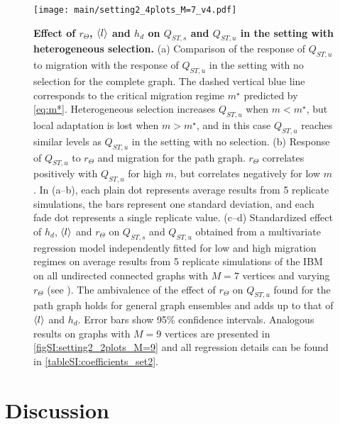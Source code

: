\begin{figure}[ht] 
    \centering
      \texttt{[image: main/setting2\_4plots\_M=7\_v4.pdf]}
    \caption{\textbf{Effect of $r_\Theta$, $\langle l \rangle$ and $h_d$ on $Q_{ST,s}$ and $Q_{ST,u}$ in the setting with heterogeneous selection.}
    (a) Comparison of the response of $Q_{ST,u}$ to migration with the response of $Q_{ST,u}$ in the setting with no selection for the complete graph. The dashed vertical blue line corresponds to the critical migration regime $m^\star$ predicted by \cref{eq:m*}. Heterogeneous selection increases $Q_{ST,u}$ when $m < m^\star$, but local adaptation is lost when $m > m^\star$, and in this case $Q_{ST,u}$ reaches similar levels as $Q_{ST,u}$ in the setting with no selection. 
    (b) Response of $Q_{ST,u}$ to $r_\Theta$ and migration for the path graph. $r_\Theta$ correlates positively with $Q_{ST,u}$ for high $m$, but correlates negatively for low $m$.
    In (a--b), each plain dot represents average results from 5 replicate simulations, the bars represent one standard deviation, and each fade dot represents a single replicate value.
    (c--d) Standardized effect of $h_d$, $\langle l \rangle$ and $r_\Theta$ on $Q_{ST,s}$ and $Q_{ST,u}$ obtained from a multivariate regression model independently fitted for low and high migration regimes on average results from 5 replicate simulations of the IBM on all undirected connected graphs with $M=7$ vertices and varying $r_\Theta$ (see ).
    The ambivalence of the effect of $r_\Theta$ on $Q_{ST,u}$ found for the path graph holds for general graph ensembles and adds up to that of $\langle l \rangle$ and $h_d$.
    Error bars show 95\% confidence intervals.
    Analogous results on graphs with $M=9$ vertices are presented in \cref{figSI:setting2_2plots_M=9} and all regression details can be found in \cref{tableSI:coefficients_set2}.
    }
    \label{fig:setting2_4plots_M=7}
\end{figure}

\clearpage

\section{Discussion}

